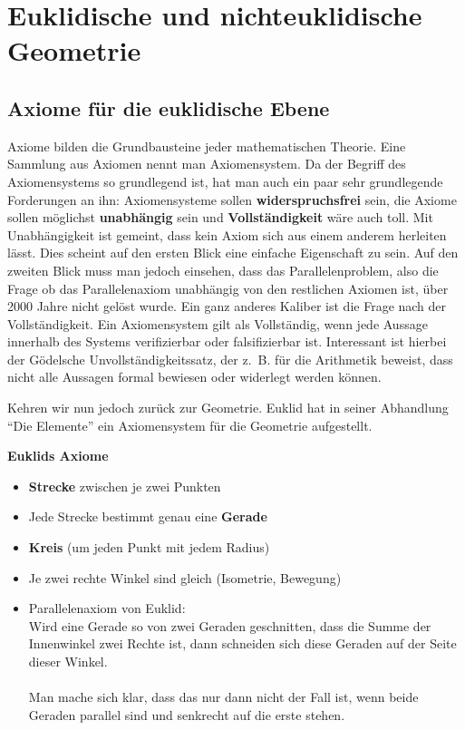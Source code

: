 \chapter{Euklidische und nichteuklidische Geometrie}
\section{Axiome für die euklidische Ebene}
Axiome bilden die Grundbausteine jeder mathematischen Theorie. Eine
Sammlung aus Axiomen nennt man Axiomensystem.
Da der Begriff des Axiomensystems so grundlegend ist, hat man auch 
ein paar sehr grundlegende Forderungen an ihn: Axiomensysteme sollen
\textbf{widerspruchsfrei} sein, die Axiome sollen möglichst
\textbf{unabhängig} sein und \textbf{Vollständigkeit} wäre auch toll.
Mit Unabhängigkeit ist gemeint, dass kein Axiom sich aus einem anderem
herleiten lässt. Dies scheint auf den ersten Blick eine einfache
Eigenschaft zu sein. Auf den zweiten Blick muss man jedoch einsehen, 
dass das Parallelenproblem, also die Frage ob das Parallelenaxiom 
unabhängig von den restlichen Axiomen ist, über 2000 Jahre nicht 
gelöst wurde. Ein ganz anderes Kaliber ist die Frage nach der
Vollständigkeit. Ein Axiomensystem gilt als Vollständig, wenn
jede Aussage innerhalb des Systems verifizierbar oder falsifizierbar
ist. Interessant ist hierbei der Gödelsche Unvollständigkeitssatz, 
der z.~B. für die Arithmetik beweist, dass nicht alle Aussagen
formal bewiesen oder widerlegt werden können.

Kehren wir nun jedoch zurück zur Geometrie. Euklid hat in seiner 
Abhandlung \enquote{Die Elemente} ein Axiomensystem für die Geometrie
aufgestellt. 

\textbf{Euklids Axiome}
\begin{itemize}
    \item \textbf{Strecke} zwischen je zwei Punkten
    \item Jede Strecke bestimmt genau eine \textbf{Gerade}
    \item \textbf{Kreis} (um jeden Punkt mit jedem Radius)
    \item Je zwei rechte Winkel sind gleich (Isometrie, Bewegung)
    \item Parallelenaxiom von Euklid:\\
        Wird eine Gerade so von zwei Geraden geschnitten, dass die 
        Summe der Innenwinkel zwei Rechte ist, dann schneiden sich
        diese Geraden auf der Seite dieser Winkel.\\
        \\
        Man mache sich klar, dass das nur dann nicht der Fall ist, 
        wenn beide Geraden parallel sind und senkrecht auf die erste stehen.
\end{itemize}

